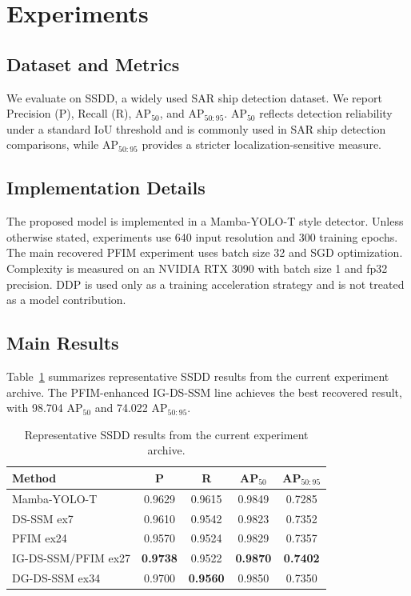 \documentclass[letterpaper]{article}
\begin{document}
\section{Experiments}

\subsection{Dataset and Metrics}

We evaluate on SSDD, a widely used SAR ship detection dataset. We report Precision (P), Recall (R), AP$_{50}$, and AP$_{50:95}$. AP$_{50}$ reflects detection reliability under a standard IoU threshold and is commonly used in SAR ship detection comparisons, while AP$_{50:95}$ provides a stricter localization-sensitive measure.

\subsection{Implementation Details}

The proposed model is implemented in a Mamba-YOLO-T style detector. Unless otherwise stated, experiments use 640 input resolution and 300 training epochs. The main recovered PFIM experiment uses batch size 32 and SGD optimization. Complexity is measured on an NVIDIA RTX 3090 with batch size 1 and fp32 precision. DDP is used only as a training acceleration strategy and is not treated as a model contribution.

\subsection{Main Results}

Table~\ref{tab:ssdd-main} summarizes representative SSDD results from the current experiment archive. The PFIM-enhanced IG-DS-SSM line achieves the best recovered result, with 98.704 AP$_{50}$ and 74.022 AP$_{50:95}$.

\begin{table}[t]
\centering
\caption{Representative SSDD results from the current experiment archive.}
\label{tab:ssdd-main}
\begin{tabular}{lcccc}
\toprule
Method & P & R & AP$_{50}$ & AP$_{50:95}$ \\
\midrule
Mamba-YOLO-T & 0.9629 & 0.9615 & 0.9849 & 0.7285 \\
DS-SSM ex7 & 0.9610 & 0.9542 & 0.9823 & 0.7352 \\
PFIM ex24 & 0.9570 & 0.9524 & 0.9829 & 0.7357 \\
IG-DS-SSM/PFIM ex27 & \textbf{0.9738} & 0.9522 & \textbf{0.9870} & \textbf{0.7402} \\
DG-DS-SSM ex34 & 0.9700 & \textbf{0.9560} & 0.9850 & 0.7350 \\
\bottomrule
\end{tabular}
\end{table}
\end{document}
